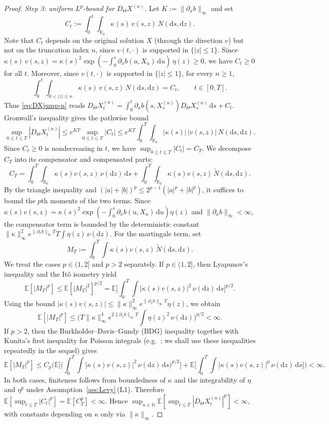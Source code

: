 \documentclass[11pt]{article}
\newcommand{\R}{\mathbb{R}}
\newcommand{\E}{\mathbb{E}}
\newcommand{\1}{\mathbf{1}}
\newcommand{\dd}{\mathrm{d}}
\theoremstyle{plain}
\theoremstyle{definition}
\theoremstyle{remark}
\begin{document}
\begin{proof}
\medskip
\noindent\emph{Step 3: uniform $L^p$-bound for $D_\Theta X^{(n)}$.}
Let $K:=\|\partial_x b\|_\infty$ and set
\[
C_t:=\int_0^t\int_{\R_0}\kappa(s)\,v(s,z)\,N(\dd s,\dd z).
\]
Note that $C_t$ depends on the original solution $X$ (through the direction $v$) but not on the truncation index $n$, since $v(t,\cdot)$ is supported in $\{|z|\le1\}$.
Since $\kappa(s)\,v(s,z)=\kappa(s)^2\exp(-\int_0^s \partial_x b(u,X_u)\,\dd u)\,\eta(z)\ge 0$, we have $C_t\ge 0$ for all $t$.
Moreover, since $v(t,\cdot)$ is supported in $\{|z|\le1\}$, for every $n\ge1$,
\[
\int_0^t\int_{0<|z|\le n}\kappa(s)\,v(s,z)\,N(\dd s,\dd z)=C_t,\qquad t\in[0,T].
\]
Thus \eqref{eq:DXjump-n} reads $D_\Theta X^{(n)}_t=\int_0^t \partial_x b(s,X^{(n)}_s)D_\Theta X^{(n)}_s\,\dd s+C_t$.
Gronwall's inequality gives the pathwise bound
\[
\sup_{0\le t\le T}|D_\Theta X^{(n)}_t|
\le e^{KT}\sup_{0\le t\le T}|C_t|
\le e^{KT}\int_0^T\int_{\R_0}|\kappa(s)|\,|v(s,z)|\,N(\dd s,\dd z).
\]
Since $C_t\ge 0$ is nondecreasing in $t$, we have $\sup_{0\le t\le T}|C_t|=C_T$.
We decompose $C_T$ into its compensator and compensated parts:
\[
C_T=\int_0^T\int_{\R_0}\kappa(s)v(s,z)\,\nu(\dd z)\,\dd s
+\int_0^T\int_{\R_0}\kappa(s)v(s,z)\,\tilde N(\dd s,\dd z).
\]
By the triangle inequality and $(|a|+|b|)^p\le 2^{p-1}(|a|^p+|b|^p)$, it suffices to bound the $p$th moments of the two terms.
Since $\kappa(s)v(s,z)=\kappa(s)^2\exp(-\int_0^s \partial_x b(u,X_u)\,\dd u)\eta(z)$ and $\|\partial_x b\|_\infty<\infty$,
the compensator term is bounded by the deterministic constant
$\|\kappa\|_\infty^2 e^{\|\partial_x b\|_\infty T}T\int \eta(z)\,\nu(\dd z)$.
For the martingale term, set
\[
M_T:=\int_0^T\int \kappa(s)v(s,z)\,\tilde N(\dd s,\dd z).
\]
We treat the cases $p\in(1,2]$ and $p>2$ separately.
If $p\in(1,2]$, then Lyapunov's inequality and the It\^o isometry yield
\[
\E[|M_T|^p]\le \E[|M_T|^2]^{p/2}
=\E\Big[\int_0^T\!\!\int|\kappa(s)v(s,z)|^2\,\nu(\dd z)\,\dd s\Big]^{p/2}.
\]
Using the bound $|\kappa(s)v(s,z)|\le \|\kappa\|_\infty^2e^{\|\partial_x b\|_\infty T}\eta(z)$, we obtain
\[
\E[|M_T|^p]\le \Big(T\|\kappa\|_\infty^4e^{2\|\partial_x b\|_\infty T}\int \eta(z)^2\,\nu(\dd z)\Big)^{p/2}<\infty.
\]
If $p>2$, then the Burkholder--Davis--Gundy (BDG) inequality together with Kunita's first inequality for Poisson integrals (e.g.\ \cite[Theorem~4.4.23]{Applebaum2009}; we shall use these inequalities repeatedly in the sequel) gives
\[
\E[|M_T|^p]\le C_p\Big(\E\Big[\Big(\int_0^T\!\!\int|\kappa(s)v(s,z)|^2\,\nu(\dd z)\,\dd s\Big)^{p/2}\Big]
+\E\Big[\int_0^T\!\!\int|\kappa(s)v(s,z)|^p\,\nu(\dd z)\,\dd s\Big]\Big)<\infty.
\]
In both cases, finiteness follows from boundedness of $\kappa$ and the integrability of $\eta$ and $\eta^p$ under Assumption~\ref{ass:Levy}\,(L1).
Therefore $\E[\sup_{t\le T}|C_t|^p]=\E[C_T^p]<\infty$.
Hence $\sup_{n\in\mathbb{N}}\E[\sup_{t\le T}|D_\Theta X^{(n)}_t|^p]<\infty$,
with constants depending on $\kappa$ only via $\|\kappa\|_\infty$.


\end{proof}
\end{document}
